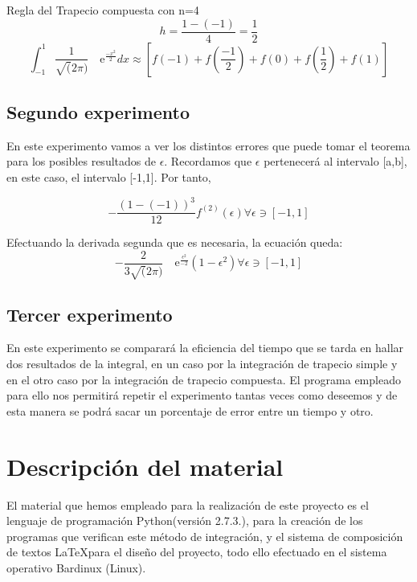  Regla del Trapecio compuesta con n=4
\[
h=\frac{1-(-1)}{4} =\frac{1}{2} 
\]
\[
\int_{-1}^{1} \frac{1}{\sqrt(2\pi)} \quad\text{e}^{\frac{-x^2}{2}}dx\approx\left[f(-1) + f(\frac{-1}{2}) + f(0) + f(\frac{1}{2}) + f(1)\right]
\]


\subsection{Segundo experimento}
En este experimento vamos a ver los distintos errores que puede tomar el teorema para los posibles resultados de $\epsilon$.
Recordamos que $\epsilon$ pertenecerá al intervalo [a,b], en este caso, el intervalo [-1,1].
Por tanto,

\[
-\frac{\left(1-(-1)\right)^3}{12}  \displaystyle f^{(2)}(\epsilon)

\forall \epsilon \owns [-1,1]
\]


Efectuando la derivada segunda que es necesaria, la ecuación queda:
\[
-\frac{2}{3\sqrt(2\pi)} \quad\text{e}^{\frac{\epsilon^2}{-2}}  \displaystyle  (1-\epsilon^2)

\forall \epsilon \owns [-1,1]
\]



\subsection{Tercer experimento}
En este experimento se comparará la eficiencia del tiempo que se tarda en hallar dos resultados de la integral, en un caso
 por la integración de trapecio simple y en el otro caso por la integración de trapecio compuesta. El programa empleado para
ello nos permitirá repetir el experimento tantas veces como deseemos y de esta manera se podrá sacar un porcentaje de error entre un tiempo 
y otro.



\section{Descripción del material}
\label{3:sec:2}
\parindent=0.2cm
\raggedright
El material que hemos empleado para la realización de este proyecto es el lenguaje de
programación Python(versión 2.7.3.), para la creación de los programas que verifican este método de integración, 
y el sistema de composición de textos \LaTeX para el diseño del proyecto, todo ello efectuado en el sistema operativo
Bardinux (Linux).


